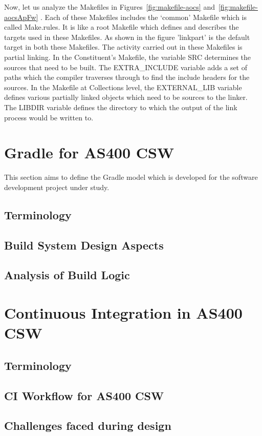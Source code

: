 \documentclass[12pt, a4paper, titlepage]{scrartcl}
\begin{document}
\par Now, let us analyze the Makefiles in Figures~\ref{fig:makefile-aocs} and~\ref{fig:makefile-aocsApFw} . Each of these Makefiles includes the ‘common’ Makefile which is called Make.rules. It is like a root Makefile which defines and describes the targets used in these Makefiles. As shown in the figure 'linkpart' is the default target in both these Makefiles. The activity carried out in these Makefiles is partial linking. In the Constituent's Makefile, the variable SRC determines the sources that need to be built. The EXTRA\_INCLUDE variable adds a set of paths which the compiler traverses through to find the include headers for the sources. In the Makefile at Collections level, the EXTERNAL\_LIB variable defines various partially linked objects which need to be sources to the linker. The LIBDIR variable defines the directory to which the output of the link process would be written to.


\section{Gradle for AS400 CSW}
 This section aims to define the Gradle model which is developed for the software development project under study. 
\subsection{Terminology}
\subsection{Build System Design Aspects}
\subsection{Analysis of Build Logic}

\section{Continuous Integration in AS400 CSW}
\subsection{Terminology}
\subsection{CI Workflow for AS400 CSW}
\subsection{Challenges faced during design}
\end{document}
